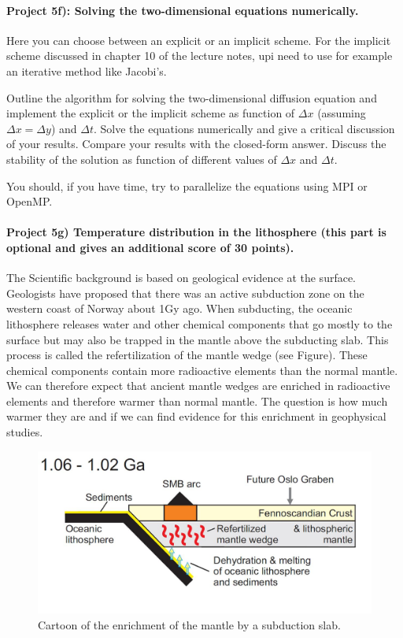 \documentclass[%
oneside,                 %
final,                   %
10pt]{article}
\begin{document}
\paragraph{Project 5f): Solving the two-dimensional equations numerically.}
Here you can choose between an explicit or an implicit scheme. 
For the implicit scheme discussed in chapter 10 of the lecture notes, upi need to use for example an iterative method like Jacobi's.

Outline the algorithm for solving the two-dimensional diffusion equation and 
implement the explicit or the implicit scheme as function of $\Delta x$ (assuming
$\Delta x = \Delta y$) and $\Delta t$. Solve the equations numerically and give a critical discussion of your results. 
Compare your results with the closed-form answer. Discuss the stability
of the solution as function of different values of $\Delta x$  and $\Delta t$. 

You should, if you have time, try to  parallelize the equations using MPI or OpenMP. 


\paragraph{Project 5g) Temperature distribution in the lithosphere (this part is optional and gives an additional score of 30 points).}
The Scientific background is  based on geological evidence at the surface. Geologists have proposed
that there was an active subduction zone on the western coast of
Norway about 1Gy ago. When subducting, the oceanic lithosphere
releases water and other chemical components that go mostly to the
surface but may also be trapped in the mantle above the subducting
slab. This process is called the refertilization of the mantle wedge
(see Figure). These chemical components contain more radioactive
elements than the normal mantle. We can therefore expect that ancient
mantle wedges are enriched in radioactive elements and therefore
warmer than normal mantle. The question is how much warmer they are
and if we can find evidence for this enrichment in geophysical
studies.

\begin{figure}[!ht]  %
  \centerline{\includegraphics[width=0.6\linewidth]{figslides/slab.jpg}}
  \caption{
  Cartoon of the enrichment of the mantle by a subduction slab.
  }
\end{figure}
\end{document}
